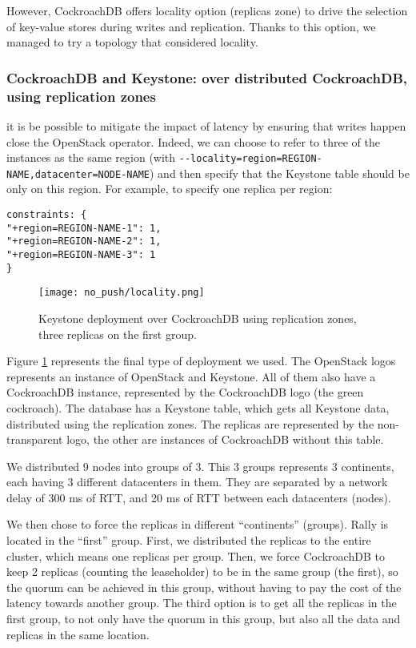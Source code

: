However, CockroachDB offers locality option (replicas zone) to drive the selection of key-value stores during writes and replication. Thanks to this option, we managed to try a topology that considered locality.


\subsubsection{CockroachDB and Keystone: over distributed CockroachDB, using replication zones}
\label{subsubsec:replication-zones}
 it is be possible to mitigate the impact of latency by ensuring that writes happen close the OpenStack operator. Indeed, we can choose to refer to three of the instances as the same region (with \verb+--locality=region=REGION-NAME,datacenter=NODE-NAME+) and then specify that the Keystone table should be only on this region. For example, to specify one replica per region:
\begin{verbatim}
constraints: {
"+region=REGION-NAME-1": 1,
"+region=REGION-NAME-2": 1,
"+region=REGION-NAME-3": 1
}
\end{verbatim}

\begin{figure}
  \begin{center}
    \texttt{[image: no\_push/locality.png]}
  \end{center}
  \vspace{-20pt}
  \caption{Keystone deployment over CockroachDB using replication zones, three replicas on the first group.}
  \vspace{-15pt}
  \label{fig:locality}
\end{figure}


Figure \ref{fig:locality} represents the final type of deployment we used. The OpenStack logos represents an instance of OpenStack and Keystone. All of them also have a CockroachDB instance, represented by the CockroachDB logo (the green cockroach). The database has a Keystone table, which gets all Keystone data, distributed using the replication zones. The replicas are represented by the non-transparent logo, the other are instances of CockroachDB without this table.

We distributed 9 nodes into groups of 3. This 3 groups represents 3 continents, each having 3 different datacenters in them. They are separated by a network delay of 300 ms of RTT, and 20 ms of RTT between each datacenters (nodes).

We then chose to force the replicas in different ``continents'' (groups). Rally is located in the ``first'' group. First, we distributed the replicas to the entire cluster, which means one replicas per group. Then, we force CockroachDB to keep 2 replicas (counting the leaseholder) to be in the same group (the first), so the quorum can be achieved in this group, without having to pay the cost of the latency towards another group. The third option is to get all the replicas in the first group, to not only have the quorum in this group, but also all the data and replicas in the same location.



